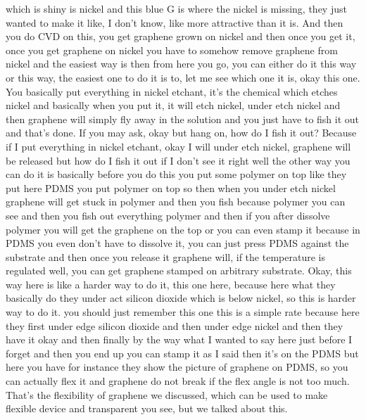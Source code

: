 which is shiny is nickel and this blue G is where the nickel is missing, they just wanted to make it like, I don't know, like more attractive than it is. And then you do CVD on this, you get graphene grown on nickel and then once you get it, once you get graphene on nickel you have to somehow remove graphene from nickel and the easiest way is then from here you go, you can either do it this way or this way, the easiest one to do it is to, let me see which one it is, okay this one. You basically put everything in nickel etchant, it's the chemical which etches nickel and basically when you put it, it will etch nickel, under etch nickel and then graphene will simply fly away in the solution and you just have to fish it out and that's done. If you may ask, okay but hang on, how do I fish it out? Because if I put everything in nickel etchant, okay I will under etch nickel, graphene will be released but how do I fish it out if I don't see it right well the other way you can do it is basically before you do this you put some polymer on top like they put here PDMS you put polymer on top so then when you under etch nickel graphene will get stuck in polymer and then you fish because polymer you can see and then you fish out everything polymer and then if you after dissolve polymer you will get the graphene on the top or you can even stamp it because in PDMS you even don't have to dissolve it, you can just press PDMS against the substrate and then once you release it graphene will, if the temperature is regulated well, you can get graphene stamped on arbitrary substrate. Okay, this way here is like a harder way to do it, this one here, because here what they basically do they under act silicon dioxide which is below nickel, so this is harder way to do it. you should just remember this one this is a simple rate because here they first under edge silicon dioxide and then under edge nickel and then they have it okay and then finally by the way what I wanted to say here just before I forget and then you end up you can stamp it as I said then it's on the PDMS but here you have for instance they show the picture of graphene on PDMS, so you can actually flex it and graphene do not break if the flex angle is not too much. That's the flexibility of graphene we discussed, which can be used to make flexible device and transparent you see, but we talked about this.
